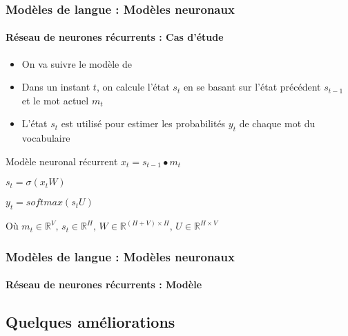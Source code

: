 \documentclass[xcolor=table]{beamer}
\begin{document}
\begin{frame}
\frametitle{Modèles de langue : Modèles neuronaux}
\framesubtitle{Réseau de neurones récurrents : Cas d'étude}

\begin{itemize}
	\item On va suivre le modèle de \cite{2010-mokolov-al}
	\item Dans un instant $t$, on calcule l'état $s_t$ en se basant sur l'état précédent $s_{t-1}$ et le mot actuel $m_t$
	\item L'état $s_t$ est utilisé pour estimer les probabilités $y_t$ de chaque mot du vocabulaire
\end{itemize}

\begin{block}{Modèle neuronal récurrent}
	$x_t = s_{t-1} \bullet m_t$
	
	$s_t = \sigma(x_t W)$
	
	$y_t = softmax(s_t U)$
	
	Où $m_t \in \mathbb{R}^{V},\, s_t \in \mathbb{R}^{H},\, W \in \mathbb{R}^{(H+V)\times H},\, U \in \mathbb{R}^{H\times V}$
\end{block}

\end{frame}

\begin{frame}
\frametitle{Modèles de langue : Modèles neuronaux}
\framesubtitle{Réseau de neurones récurrents : Modèle}


\end{frame}

\subsection{Quelques améliorations}
\end{document}

